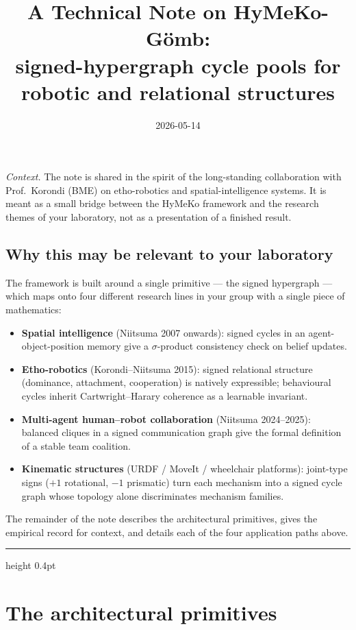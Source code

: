 \documentclass[11pt,a4paper]{article}
\title{A Technical Note on HyMeKo-G\"omb:\\
       signed-hypergraph cycle pools for\\
       robotic and relational structures}
\date{2026-05-14}
\author{}
\newcommand{\sig}{\ensuremath{\sigma}}
\begin{document}
\maketitle
\thispagestyle{fancy}

\noindent\emph{Context.} The note is shared in the spirit of the
long-standing collaboration with Prof.~Korondi (BME) on
etho-robotics and spatial-intelligence systems. It is meant as a
small bridge between the HyMeKo framework and the research themes
of your laboratory, not as a presentation of a finished result.

\subsection*{Why this may be relevant to your laboratory}

The framework is built around a single primitive --- the signed
hypergraph --- which maps onto four different research lines in your
group with a single piece of mathematics:

\begin{itemize}
\setlength{\itemsep}{0.15em}
\item \textbf{Spatial intelligence} (Niitsuma 2007 onwards):
  signed cycles in an agent-object-position memory give a
  $\sig$-product consistency check on belief updates.
\item \textbf{Etho-robotics} (Korondi--Niitsuma 2015): signed
  relational structure (dominance, attachment, cooperation) is
  natively expressible; behavioural cycles inherit Cartwright--Harary
  coherence as a learnable invariant.
\item \textbf{Multi-agent human--robot collaboration} (Niitsuma
  2024--2025): balanced cliques in a signed communication graph
  give the formal definition of a stable team coalition.
\item \textbf{Kinematic structures} (URDF / MoveIt / wheelchair
  platforms): joint-type signs ($+1$ rotational, $-1$ prismatic)
  turn each mechanism into a signed cycle graph whose topology
  alone discriminates mechanism families.
\end{itemize}

The remainder of the note describes the architectural primitives,
gives the empirical record for context, and details each of the
four application paths above.

\hrule height 0.4pt
\vspace{0.4em}

\section{The architectural primitives}
\end{document}
